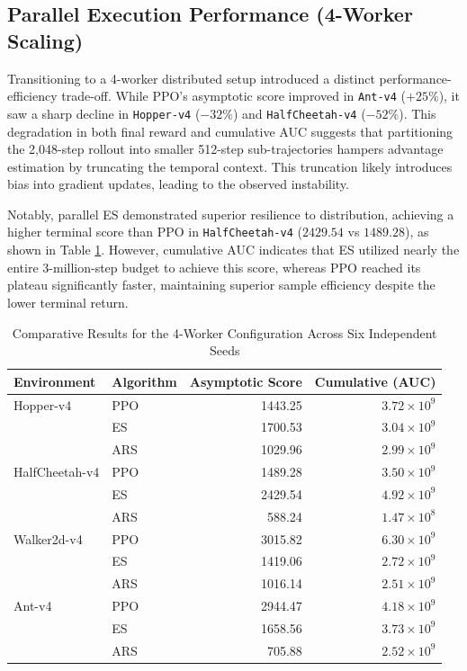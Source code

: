 \subsection{Parallel Execution Performance (4-Worker Scaling)}
Transitioning to a 4-worker distributed setup introduced a distinct performance-efficiency trade-off. While PPO’s asymptotic score improved in \texttt{Ant-v4} ($+25\%$), it saw a sharp decline in \texttt{Hopper-v4} ($-32\%$) and \texttt{HalfCheetah-v4} ($-52\%$). This degradation in both final reward and cumulative AUC suggests that partitioning the 2,048-step rollout into smaller 512-step sub-trajectories hampers advantage estimation by truncating the temporal context. This truncation likely introduces bias into gradient updates, leading to the observed instability.

Notably, parallel ES demonstrated superior resilience to distribution, achieving a higher terminal score than PPO in \texttt{HalfCheetah-v4} ($2429.54$ vs $1489.28$), as shown in Table \ref{tab:4w_asymptotic}. However, cumulative AUC indicates that ES utilized nearly the entire 3-million-step budget to achieve this score, whereas PPO reached its plateau significantly faster, maintaining superior sample efficiency despite the lower terminal return.

\begin{table}[h!]
\centering
\caption{Comparative Results for the 4-Worker Configuration Across Six Independent Seeds}
\label{tab:4w_asymptotic}
\begin{tabular}{@{}llrr@{}}
\toprule
\textbf{Environment} & \textbf{Algorithm} & \textbf{Asymptotic Score} & \textbf{Cumulative (AUC)} \\ \midrule
Hopper-v4 & PPO & 1443.25 & $3.72 \times 10^9$ \\
 & ES & 1700.53 & $3.04 \times 10^9$ \\
 & ARS & 1029.96 & $2.99 \times 10^9$ \\ \addlinespace
HalfCheetah-v4 & PPO & 1489.28 & $3.50 \times 10^9$ \\
 & ES & 2429.54 & $4.92 \times 10^9$ \\
 & ARS & 588.24 & $1.47 \times 10^8$ \\ \addlinespace
Walker2d-v4 & PPO & 3015.82 & $6.30 \times 10^9$ \\
 & ES & 1419.06 & $2.72 \times 10^9$ \\
 & ARS & 1016.14 & $2.51 \times 10^9$ \\ \addlinespace
Ant-v4 & PPO & 2944.47 & $4.18 \times 10^9$ \\
 & ES & 1658.56 & $3.73 \times 10^9$ \\
 & ARS & 705.88 & $2.52 \times 10^9$ \\ \bottomrule
\end{tabular}
\end{table}

